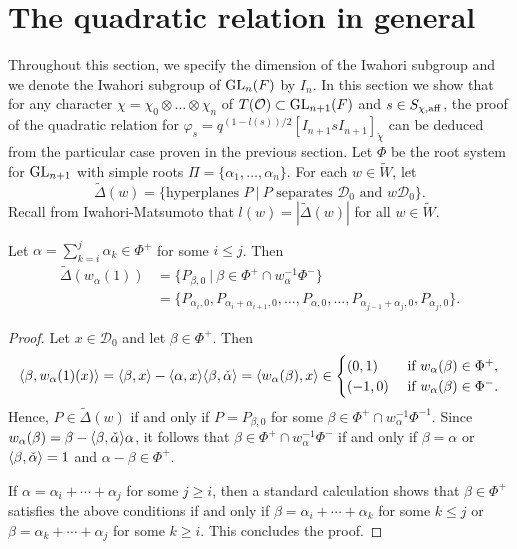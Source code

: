 \section{The quadratic relation in general}
    Throughout this section, we specify the dimension of the Iwahori subgroup and we denote the Iwahori subgroup of $\mathrm{GL}_n(F)$ by $I_n$. In this section we show that for any character $\chi=\chi_0\otimes\ldots\otimes\chi_n$ of $T(\mathcal{O})\subset\mathrm{GL}_{n+1}(F)$ and $s\in S_{\chi,\mathrm{aff}}$, the proof of the quadratic relation for $\varphi_s=q^{(1-l(s))/2}[I_{n+1}sI_{n+1}]_{\check{\chi}}$ can be deduced from the particular case proven in the previous section. Let $\Phi$ be the root system for $\mathrm{GL}_{n+1}$ with simple roots $\Pi=\{\alpha_1,\ldots,\alpha_n\}$. For each $w\in\widetilde{W}$, let 
    $$\widetilde{\Delta}(w)=\{\text{hyperplanes }P\ |\ P\text{ separates }\mathcal{D}_0\text{ and }w\mathcal{D}_0\}.$$
    Recall from Iwahori-Matsumoto that $l(w)=|\widetilde{\Delta}(w)|$ for all $w\in\widetilde{W}$.

    \begin{lemma}\label{lem_w1}
        Let $\alpha=\sum_{k=i}^{j}\alpha_k\in\Phi^+$ for some $i\leq j$. Then
        \begin{align*}
            \widetilde{\Delta}(w_\alpha(1))&=\{P_{\beta,0}\ |\ \beta\in\Phi^+\cap w_\alpha^{-1}\Phi^-\}\\
            &=\{P_{\alpha_i,0},P_{\alpha_i+\alpha_{i+1},0},\ldots,P_{\alpha,0},\ldots,P_{\alpha_{j-1}+\alpha_j,0},P_{\alpha_j,0}\}.
        \end{align*}
    \end{lemma}

    \begin{proof}
        Let $x\in\mathcal{D}_0$ and let $\beta\in\Phi^+$. Then
        \begin{equation*}
            \langle\beta,w_\alpha(1)(x)\rangle=\langle\beta,x\rangle-\langle\alpha,x\rangle\langle\beta,\check{\alpha}\rangle=\langle w_\alpha(\beta),x\rangle\in
            \begin{cases}
                (0,1) &\text{ if } w_\alpha(\beta)\in\Phi^+,\\
                (-1,0) &\text{ if } w_\alpha(\beta)\in\Phi^-.
            \end{cases}
        \end{equation*}
        Hence, $P\in\widetilde{\Delta}(w)$ if and only if $P=P_{\beta,0}$ for some $\beta\in\Phi^+\cap w_\alpha^{-1}\Phi^{-1}$. Since $w_\alpha(\beta)=\beta-\langle\beta,\check{\alpha}\rangle\alpha$, it follows that $\beta\in\Phi^+\cap w_\alpha^{-1}\Phi^-$ if and only if $\beta=\alpha$ or $\langle\beta,\check{\alpha}\rangle=1$ and $\alpha-\beta\in\Phi^+$.
        
        If $\alpha=\alpha_i+\cdots+\alpha_j$ for some $j\geq i$, then a standard calculation shows that $\beta\in\Phi^+$ satisfies the above conditions if and only if $\beta=\alpha_i+\cdots+\alpha_k$ for some $k\leq j$ or $\beta=\alpha_k+\cdots+\alpha_j$ for some $k\geq i$. This concludes the proof.
    \end{proof}

